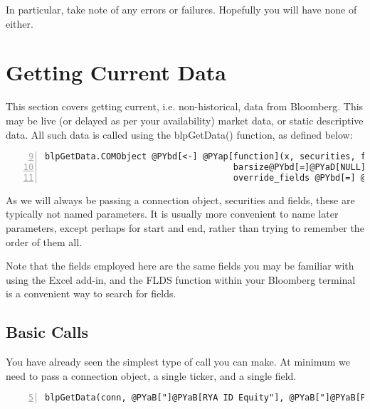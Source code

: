 \documentclass[a4paper]{article}
\begin{document}
    

In particular, take note of any errors or failures. Hopefully you will have none of either.



\section{Getting Current Data} %
\label{sec:getting_current_data}

This section covers getting current, i.e. non-historical, data from Bloomberg. This may be live (or delayed as per your availability) market data, or static descriptive data. All such data is called using the blpGetData() function, as defined below:


\begin{Verbatim}[commandchars=@\[\],numbers=left,firstnumber=9,stepnumber=1]
blpGetData.COMObject @PYbd[<-] @PYap[function](x, securities, fields, start@PYbd[=]@PYaD[NULL], end@PYbd[=]@PYaD[NULL],
                                     barsize@PYbd[=]@PYaD[NULL], barfields@PYbd[=]@PYaD[NULL], retval@PYbd[=]@PYaD[NULL], 
                                     override_fields @PYbd[=] @PYaD[NULL], overrides @PYbd[=] @PYaD[NULL], currency @PYbd[=] @PYaD[NULL], ...){
\end{Verbatim}

    

As we will always be passing a connection object, securities and fields, these are typically not named parameters. It is usually more convenient to name later parameters, except perhaps for start and end, rather than trying to remember the order of them all.

Note that the fields employed here are the same fields you may be familiar with using the Excel add-in, and the FLDS function within your Bloomberg terminal is a convenient way to search for fields.

\subsection{Basic Calls} %
\label{sub:basic_calls}

You have already seen the simplest type of call you can make. At minimum we need to pass a connection object, a single ticker, and a single field.

\begin{Verbatim}[commandchars=@\[\],numbers=left,firstnumber=5,stepnumber=1]
blpGetData(conn, @PYaB["]@PYaB[RYA ID Equity"], @PYaB["]@PYaB[PX_LAST"])
\end{Verbatim}
\end{document}
